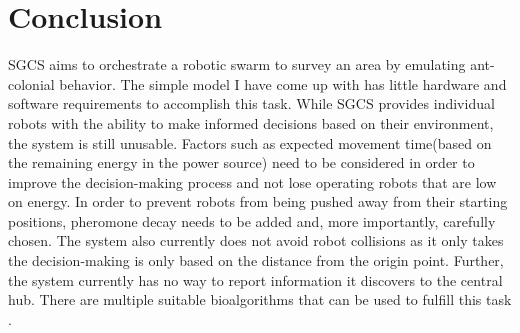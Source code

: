 \documentclass[12pt]{article}
\begin{document}
\section{Conclusion}
SGCS aims to orchestrate a robotic swarm to survey an area by emulating ant-colonial behavior. The simple model I have come up with has little hardware and software requirements to accomplish this task. While SGCS provides individual robots with the ability to make informed decisions based on their environment, the system is still unusable. Factors such as expected movement time(based on the remaining energy in the power source) need to be considered in order to improve the decision-making process and not lose operating robots that are low on energy. In order to prevent robots from being pushed away from their starting positions, pheromone decay needs to be added and, more importantly, carefully chosen. The system also currently does not avoid robot collisions as it only takes the decision-making is only based on the distance from the origin point. Further, the system currently has no way to report information it discovers to the central hub. There are multiple suitable bioalgorithms that can be used to fulfill this task \parencite{adler_information_1992}.
\printbibliography
\end{document}
